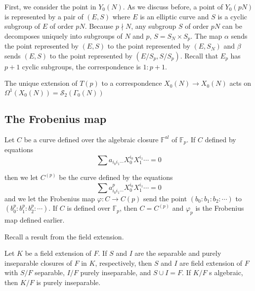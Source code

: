 \documentclass[11pt]{article}
\begin{document}
First, we consider the point in $Y_0(N)$. As we discuss before, a point of $Y_0(pN)$ is represented by a pair of $(E,S)$ where $E$
 is an elliptic curve and $S$ is a cyclic subgroup of $E$ of order $pN$. Because $p\nmid N$, any subgroup $S$ of order $pN$ can be 
 decomposes uniquely into subgroups of $N$ and $p$, $S=S_N \times S_p$. The map $\alpha$ sends the point represented by $(E,S)$ 
 to the point represented by $(E,S_N)$ and $\beta$ sends $(E,S)$ to the point represented by $(E/S_p,S/S_p)$. Recall that $E_p$ 
 has $p+1$ cyclic subgroups, the correspondence is $1:p+1$.\par
 The unique extension of $T(p)$ to a correspondence $X_0(N)\rightarrow X_0(N)$ acts on $\Omega^{1}(X_0(N))=\mathcal{S}_2 (\Gamma_0(N))$

 \subsection{The Frobenius map}
 Let $C$ be a curve defined over the algebraic closure $\mathbb{F}^{al}$ of $\mathbb{F}_p$. If $C$ defined by equations 
 \begin{equation*}
    \sum a_{i_0i_1\cdots}X_0^{i_0}X_1^{i_1}\cdots=0
 \end{equation*}

 then we let $C^{(p)}$ be the curve defined by the equations 
 \begin{equation*}
    \sum a_{i_0i_1\cdots}^p X_0^{i_0}X_1^{i_1}\cdots=0
 \end{equation*}
 and we let the Frobenius map $\varphi: C\rightarrow C{(p)}$ send the point ${(b_0:b_1:b_2:\cdots)}$ to ${(b_0^p:b_1^p:b_2^p:\cdots)}$.
 If $C$ is defined over $\mathbb{F}_p$, then $C=C^{(p)}$ and $\varphi_p$ is the Frobenius map defined earlier.\par
 Recall a result from the field extension.
 \begin{proposition}
    Let $K$ be a field extension of $F$. If $S$ and $I$ are the separable and purely inseparable closures of $F$ in $K$, respectively,
    then $S$ and $I$ are field extension of $F$ with $S/F$ separable, $I/F$ purely inseparable, and $S\cup I=F$. If $K/F$ s algebraic,
    then $K/F$ is purely inseparable.
 \end{proposition}
\end{document}
